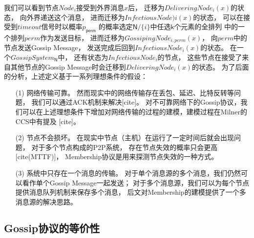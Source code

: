 我们可以看到节点$Node_i$接受到外界消息$x$后，
迁移为$DeliveringNode_i(x)$的状态，
向外界递送这个消息，
进而迁移为$InfectiousNode)i(x)$的状态，
可以在接受到$timeout$信号时以概率$p_{\mathsf{perm}}$
的概率选定$\mathsf{N}/\{i\}$中任选$\mathsf{k}$个元素的全排列
中的一个排列$perm$作为发送目标，
进而迁移为$GossipingNode_{i,perm}(x)$，
向$perm$中的节点发送Gossip Message，
发送完成后回到$InfectiousNode_i(x)$的状态。
在一个$GossipSystem_{\mathsf{N}}$中，
还有状态为$InfectiousNode_i$的节点，
这些节点在接受了来自其他节点的Gossip Message时会迁移到$DeliveringNode_i(x)$的状态。
为了后面的分析，上述定义基于一系列理想条件的假设：
\begin{itemize}
   \item [(1)] {网络传输可靠。
   然而现实中的网络传输存在丢包、延迟、比特反转等问题，
   我们可以通过ACK机制来解决[cite]。
   对不可靠网络下的Gossip协议，我们可以在上述理想条件下增加对网络传输的过程的建模，建模过程在Milner的CCS中有提及
   [cite]。
   }
   \item [(2)] {节点不会损坏。
   在现实中节点（主机）在运行了一定时间后就会出现问题，
   对于多个节点构成的P2P系统，
   存在节点失效的概率只会更高[cite(MTTF)]，
   Membership协议是用来探测节点失效的一种方式。
   }
   \item [(3)] {
      系统中只存在一个消息的传输。
      对于单个消息源的多个消息，我们仍然可以看作单个Gossip Message一起发送；
      对于多个消息源，我们可以为每个节点提供消息队列机制来保存多个消息，
      后文对Membership的建模提供了一个多消息源的解决思路。
      }
\end{itemize}

\subsection{Gossip协议的等价性}

